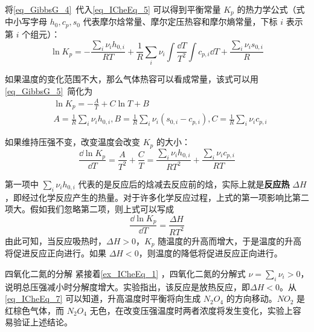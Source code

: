 将\autoref{eq_GibbsG_4}~代入\autoref{eq_ICheEq_5} 可以得到平衡常量 $K_p$ 的热力学公式（式中小写字母 $h_0,c_p,s_0$ 代表摩尔焓常量、摩尔定压热容和摩尔熵常量，下标 $i$ 表示第 $i$ 个组元）：
\begin{equation}
\ln K_p=-\frac{\sum_i \nu_i h_{0,i}}{RT}+\frac{1}{R}\sum_i\nu_i\int \frac{\dd T}{T^2}\int c_{p,i}\dd T + \frac{\sum_i \nu_i s_{0,i}}{R}
\end{equation}

如果温度的变化范围不大，那么气体热容可以看成常量，该式可以用\autoref{eq_GibbsG_5}~简化为
\begin{equation}
\begin{aligned}
&\ln K_p=-\frac{A}{T}+C\ln T+B\\
&A=\frac{1}{R} \sum_i \nu_i h_{0,i},B=\frac{1}{R}\sum_i \nu_i(s_{0,i}-c_{p,i}),C=\frac{1}{R}\sum_i \nu_ic_{p,i}
\end{aligned}
\end{equation}

如果维持压强不变，改变温度会改变 $K_p$ 的大小：
\begin{equation}
\frac{\dd \ln K_p}{\dd T}=\frac{A}{T^2}+\frac{C}{T}=\frac{\sum_i\nu_ih_{0,i}}{RT^2}+\frac{\sum_i\nu_ic_{p,i}}{RT}
\end{equation}

第一项中 $\sum_i \nu_i h_{0,i}$ 代表的是反应后的焓减去反应前的焓，实际上就是\textbf{反应热} $\Delta H$，即经过化学反应产生的热量。对于许多化学反应过程，上式的第一项影响比第二项大。假如我们忽略第二项，则上式可以写成
\begin{equation}\label{eq_ICheEq_7}
\frac{\dd \ln K_p}{\dd T}=\frac{\Delta H}{RT^2}
\end{equation}
由此可知，当反应吸热时，$\Delta H>0$，$K_p$ 随温度的升高而增大，于是温度的升高将促进反应正向进行。如果 $\Delta H<0$，则温度的降低将促进反应正向进行。
\begin{example}{四氧化二氮的分解}
紧接着\autoref{ex_ICheEq_1} ，四氧化二氮的分解式 $\nu=\sum_i\nu_i>0$，说明总压强减小时分解度增大。实验指出，该反应是放热反应，即$\Delta H<0$。从\autoref{eq_ICheEq_7} 可以知道，升高温度时平衡将向生成 $N_2O_4$ 的方向移动。$NO_2$ 是红棕色气体，而 $N_2O_4$ 无色，在改变压强温度时两者浓度将发生变化，实验上容易验证上述结论。 
\end{example}
